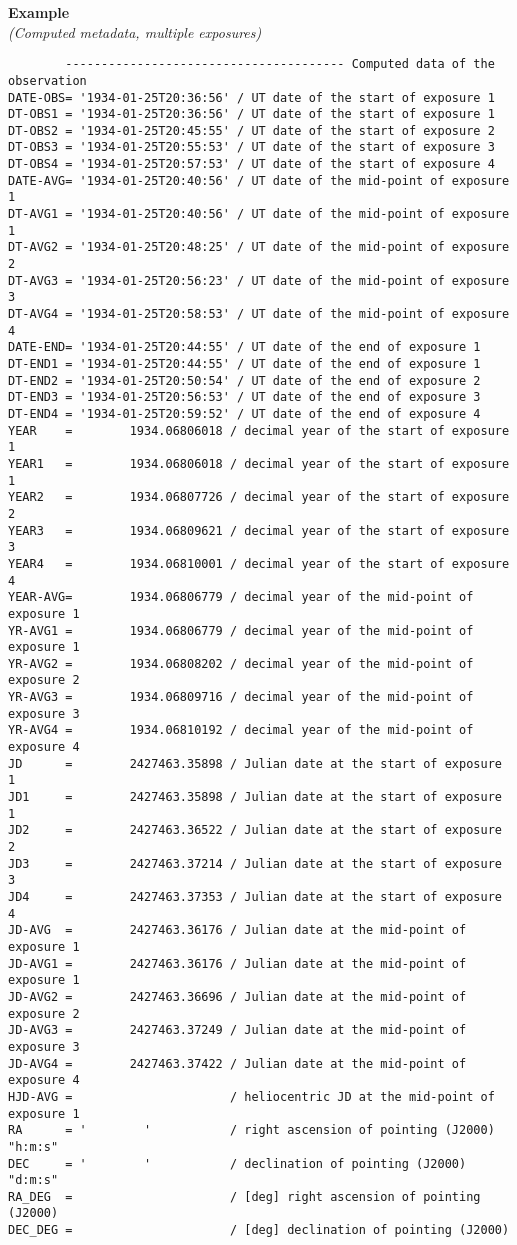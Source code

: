\documentclass[11pt]{ivoa}
\newenvironment{fitsexample}[1]
{\bigskip\noindent\textbf{Example}\\\textit{(#1\smallskip)}}
{\medskip}
\begin{document}
\begin{fitsexample}{Computed metadata, multiple exposures}
\begin{lstlisting}
        --------------------------------------- Computed data of the observation
DATE-OBS= '1934-01-25T20:36:56' / UT date of the start of exposure 1
DT-OBS1 = '1934-01-25T20:36:56' / UT date of the start of exposure 1
DT-OBS2 = '1934-01-25T20:45:55' / UT date of the start of exposure 2
DT-OBS3 = '1934-01-25T20:55:53' / UT date of the start of exposure 3
DT-OBS4 = '1934-01-25T20:57:53' / UT date of the start of exposure 4
DATE-AVG= '1934-01-25T20:40:56' / UT date of the mid-point of exposure 1
DT-AVG1 = '1934-01-25T20:40:56' / UT date of the mid-point of exposure 1
DT-AVG2 = '1934-01-25T20:48:25' / UT date of the mid-point of exposure 2
DT-AVG3 = '1934-01-25T20:56:23' / UT date of the mid-point of exposure 3
DT-AVG4 = '1934-01-25T20:58:53' / UT date of the mid-point of exposure 4
DATE-END= '1934-01-25T20:44:55' / UT date of the end of exposure 1
DT-END1 = '1934-01-25T20:44:55' / UT date of the end of exposure 1
DT-END2 = '1934-01-25T20:50:54' / UT date of the end of exposure 2
DT-END3 = '1934-01-25T20:56:53' / UT date of the end of exposure 3
DT-END4 = '1934-01-25T20:59:52' / UT date of the end of exposure 4
YEAR    =        1934.06806018 / decimal year of the start of exposure 1
YEAR1   =        1934.06806018 / decimal year of the start of exposure 1
YEAR2   =        1934.06807726 / decimal year of the start of exposure 2
YEAR3   =        1934.06809621 / decimal year of the start of exposure 3
YEAR4   =        1934.06810001 / decimal year of the start of exposure 4
YEAR-AVG=        1934.06806779 / decimal year of the mid-point of exposure 1
YR-AVG1 =        1934.06806779 / decimal year of the mid-point of exposure 1
YR-AVG2 =        1934.06808202 / decimal year of the mid-point of exposure 2
YR-AVG3 =        1934.06809716 / decimal year of the mid-point of exposure 3
YR-AVG4 =        1934.06810192 / decimal year of the mid-point of exposure 4
JD      =        2427463.35898 / Julian date at the start of exposure 1
JD1     =        2427463.35898 / Julian date at the start of exposure 1
JD2     =        2427463.36522 / Julian date at the start of exposure 2
JD3     =        2427463.37214 / Julian date at the start of exposure 3
JD4     =        2427463.37353 / Julian date at the start of exposure 4
JD-AVG  =        2427463.36176 / Julian date at the mid-point of exposure 1
JD-AVG1 =        2427463.36176 / Julian date at the mid-point of exposure 1
JD-AVG2 =        2427463.36696 / Julian date at the mid-point of exposure 2
JD-AVG3 =        2427463.37249 / Julian date at the mid-point of exposure 3
JD-AVG4 =        2427463.37422 / Julian date at the mid-point of exposure 4
HJD-AVG =                      / heliocentric JD at the mid-point of exposure 1
RA      = '        '           / right ascension of pointing (J2000) "h:m:s"
DEC     = '        '           / declination of pointing (J2000) "d:m:s"
RA_DEG  =                      / [deg] right ascension of pointing (J2000)
DEC_DEG =                      / [deg] declination of pointing (J2000)
\end{lstlisting}
\end{fitsexample}
\end{document}
